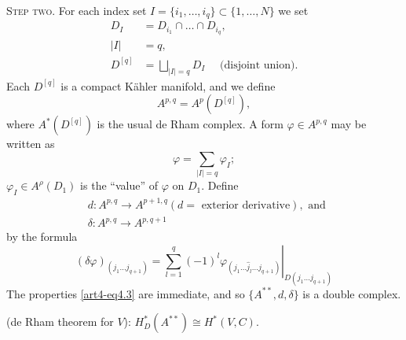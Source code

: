 \medskip
\textsc{Step two.} For each index set $I = \{i_1, \ldots, i_q\} \subset \{1, \ldots, N\}$ we set
\begin{align*}
D_I & = D_{i_1} \cap \ldots \cap D_{i_q},\\
|I| & = q , \\
 D^{[q]} & = \bigsqcup_{|I| = q} D_I \quad  \text{ (disjoint union)}.
\end{align*}
Each $D^{[q]}$ is a compact K\"ahler manifold, and we define
$$
A^{p,q} = A^p (D^{[q]}),
$$
where $A^\ast (D^{[q]})$ is the usual de Rham complex. A form $\varphi \in A^{p,q}$ may be written as 
$$
\varphi = \sum\limits_{|I| = q} \varphi_I ;
$$
$\varphi_I \in A^\rho (D_1)$ is the ``value'' of $\varphi$ on $D_1$. Define
\begin{align*}
& d : A^{p,q} \to A^{p+1,q} (d = \text{ exterior derivative}), \text{ and }\\
& \delta : A^{p,q} \to A^{p,q+1}
\end{align*}\pageoriginale 
by the formula 
\setcounter{equation}{4}
\begin{equation}\label{art4-eq4.5}
\left. (\delta \varphi)_{(j_1 \ldots j_{q+1})} = \sum^q_{l=1} (-1)^l \varphi_{(j_1 \ldots \hat{j}_l \ldots j_{q+1})}  \right|_{D (j_1 \ldots j_{q+1})}  
\end{equation}
The properties \eqref{art4-eq4.3} are immediate, and so $\{A^{\ast\ast}, d, \delta\}$ is a double complex.

\setcounter{lemma}{5}
\begin{lemma}\label{art4-lem4.6}
(de Rham theorem for $V$): $H^\ast_D (A^{\ast\ast}) \cong H^\ast (V,C)$.
\end{lemma}

